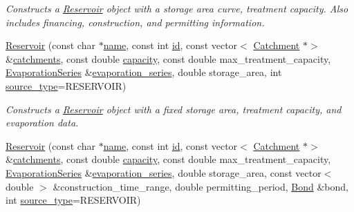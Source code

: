 \begin{DoxyCompactItemize}
\begin{DoxyCompactList}\small\item\em Constructs a \mbox{\hyperlink{classReservoir}{Reservoir}} object with a storage area curve, treatment capacity. Also includes financing, construction, and permitting information. \end{DoxyCompactList}\item 
\mbox{\hyperlink{classReservoir_a0a1041fc72df190bbc51d965ede96f49}{Reservoir}} (const char $\ast$\mbox{\hyperlink{classWaterSource_a846ea74c5b453d014f594d41fee8c765}{name}}, const int \mbox{\hyperlink{classWaterSource_a6eafe5dfefd317877d1244e8a7c6e742}{id}}, const vector$<$ \mbox{\hyperlink{classCatchment}{Catchment}} $\ast$$>$ \&\mbox{\hyperlink{classWaterSource_a8c18c34f23f8a06685c1d12f462ed830}{catchments}}, const double \mbox{\hyperlink{classWaterSource_a2ec257b415b248214a8bce7fc5267723}{capacity}}, const double max\+\_\+treatment\+\_\+capacity, \mbox{\hyperlink{classEvaporationSeries}{Evaporation\+Series}} \&\mbox{\hyperlink{classReservoir_a2d2d9b302c13703309bb798d24136810}{evaporation\+\_\+series}}, double storage\+\_\+area, int \mbox{\hyperlink{classWaterSource_afdd12c29fc74ea21dff1f1be9b8c2b7b}{source\+\_\+type}}=R\+E\+S\+E\+R\+V\+O\+IR)
\begin{DoxyCompactList}\small\item\em Constructs a \mbox{\hyperlink{classReservoir}{Reservoir}} object with a fixed storage area, treatment capacity, and evaporation data. \end{DoxyCompactList}\item 
\mbox{\hyperlink{classReservoir_a56409325d4554f8ef32a9c3605ece5c8}{Reservoir}} (const char $\ast$\mbox{\hyperlink{classWaterSource_a846ea74c5b453d014f594d41fee8c765}{name}}, const int \mbox{\hyperlink{classWaterSource_a6eafe5dfefd317877d1244e8a7c6e742}{id}}, const vector$<$ \mbox{\hyperlink{classCatchment}{Catchment}} $\ast$$>$ \&\mbox{\hyperlink{classWaterSource_a8c18c34f23f8a06685c1d12f462ed830}{catchments}}, const double \mbox{\hyperlink{classWaterSource_a2ec257b415b248214a8bce7fc5267723}{capacity}}, const double max\+\_\+treatment\+\_\+capacity, \mbox{\hyperlink{classEvaporationSeries}{Evaporation\+Series}} \&\mbox{\hyperlink{classReservoir_a2d2d9b302c13703309bb798d24136810}{evaporation\+\_\+series}}, double storage\+\_\+area, const vector$<$ double $>$ \&construction\+\_\+time\+\_\+range, double permitting\+\_\+period, \mbox{\hyperlink{classBond}{Bond}} \&bond, int \mbox{\hyperlink{classWaterSource_afdd12c29fc74ea21dff1f1be9b8c2b7b}{source\+\_\+type}}=R\+E\+S\+E\+R\+V\+O\+IR)

\end{DoxyCompactItemize}
